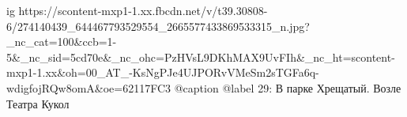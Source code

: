  
 
 
 
 

\ifcmt
  ig https://scontent-mxp1-1.xx.fbcdn.net/v/t39.30808-6/274140439_644467793529554_2665577433869533315_n.jpg?_nc_cat=100&ccb=1-5&_nc_sid=5cd70e&_nc_ohc=PzHVsL9DKhMAX9UvFIh&_nc_ht=scontent-mxp1-1.xx&oh=00_AT_-KsNgPJe4UJPORvVMeSm2sTGFa6q-wdigfojRQw8omA&oe=62117FC3
  @caption @label 29: В парке Хрещатый. Возле Театра Кукол
\fi
